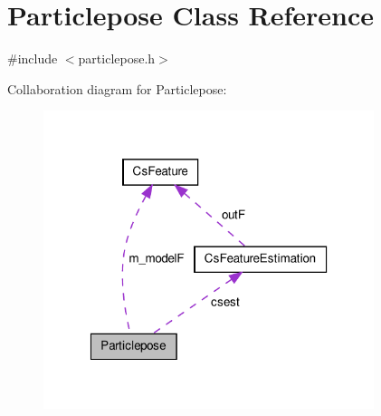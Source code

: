 \hypertarget{class_particlepose}{\section{\-Particlepose \-Class \-Reference}
\label{class_particlepose}
}


{\ttfamily \#include $<$particlepose.\-h$>$}



\-Collaboration diagram for \-Particlepose\-:
\nopagebreak
\begin{figure}[H]
\begin{center}
\leavevmode
\includegraphics[width=274pt]{class_particlepose__coll__graph}
\end{center}
\end{figure}
